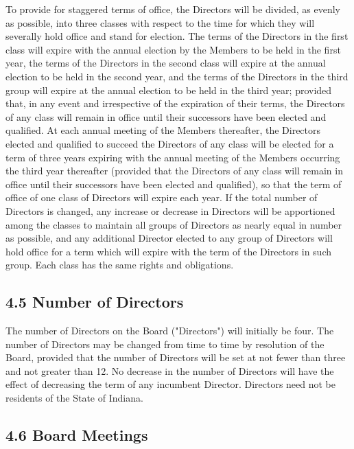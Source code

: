 \documentclass[
]{book}
\begin{document}
To provide for staggered terms of office, the Directors will be divided, as evenly as possible, into three classes with respect to the time for which they will severally hold office and stand for election. The terms of the Directors in the first class will expire with the annual election by the Members to be held in the first year, the terms of the Directors in the second class will expire at the annual election to be held in the second year, and the terms of the Directors in the third group will expire at the annual election to be held in the third year; provided that, in any event and irrespective of the expiration of their terms, the Directors of any class will remain in office until their successors have been elected and qualified. At each annual meeting of the Members thereafter, the Directors elected and qualified to succeed the Directors of any class will be elected for a term of three years expiring with the annual meeting of the Members occurring the third year thereafter (provided that the Directors of any class will remain in office until their successors have been elected and qualified), so that the term of office of one class of Directors will expire each year. If the total number of Directors is changed, any increase or decrease in Directors will be apportioned among the classes to maintain all groups of Directors as nearly equal in number as possible, and any additional Director elected to any group of Directors will hold office for a term which will expire with the term of the Directors in such group. Each class has the same rights and obligations.

\subsection{4.5 Number of Directors}\label{number-of-directors}

The number of Directors on the Board ("Directors") will initially be four. The number of Directors may be changed from time to time by resolution of the Board, provided that the number of Directors will be set at not fewer than three and not greater than 12. No decrease in the number of Directors will have the effect of decreasing the term of any incumbent Director. Directors need not be residents of the State of Indiana.

\subsection{4.6 Board Meetings}\label{board-meetings}
\end{document}
